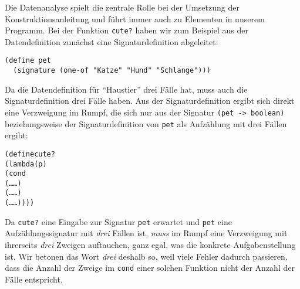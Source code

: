 Die Datenanalyse spielt die zentrale Rolle bei der Umsetzung der
Konstruktionsanleitung und führt immer auch zu Elementen in unserem
Programm.  Bei der Funktion \texttt{cute?} haben wir zum Beispiel
aus der Datendefinition zunächst eine Signaturdefinition abgeleitet:
%
\begin{verbatim}
(define pet
  (signature (one-of "Katze" "Hund" "Schlange")))
\end{verbatim}
%
Da die Datendefinition für "`Haustier"' drei Fälle hat, muss auch die
Signaturdefinition drei Fälle haben.  Aus der Signaturdefinition
ergibt sich direkt eine Verzweigung im Rumpf, die sich nur aus der
Signatur \texttt{(pet -> boolean)} beziehungsweise der
Signaturdefinition von \texttt{pet} als Aufzählung mit drei Fällen
ergibt:
%
\begin{alltt}
(define cute?
  (lambda (p)
    (cond
      (\ldots{} \ldots)
      (\ldots{} \ldots)
      (\ldots{} \ldots))))
\end{alltt}
%
Da \texttt{cute?} eine Eingabe zur Signatur \texttt{pet} erwartet und
\texttt{pet} eine Aufzählungssignatur mit \emph{drei} Fällen ist, \emph{muss}
im Rumpf eine Verzweigung mit ihrerseits \emph{drei} Zweigen
auftauchen, ganz egal, was die konkrete Aufgabenstellung ist.  Wir
betonen das Wort \emph{drei} deshalb so, weil viele Fehler dadurch
passieren, dass die Anzahl der Zweige im \texttt{cond} einer solchen
Funktion nicht der Anzahl der Fälle entspricht.

